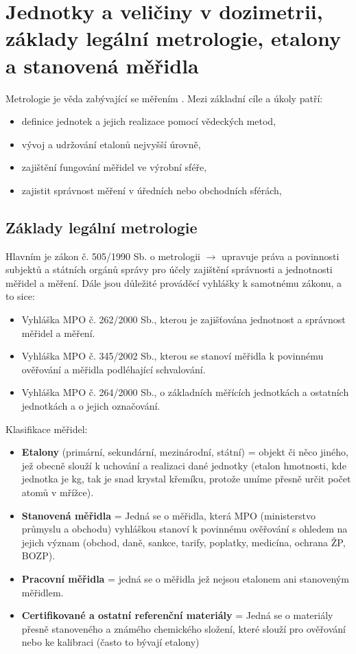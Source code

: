 \section[Jednotky a veličiny v dozimetrii]{Jednotky a veličiny v dozimetrii, základy legální metrologie, etalony a stanovená měřidla}

Metrologie je věda zabývající se měřením . Mezi základní cíle a úkoly patří:

\begin{itemize}
    \item definice jednotek a jejich realizace pomocí vědeckých metod,
    \item vývoj a udržování etalonů nejvyšší úrovně,
    \item zajištění fungování měřidel ve výrobní sféře,
    \item zajistit správnost měření v úředních nebo obchodních sférách,
\end{itemize}

\subsection{Základy legální metrologie}

Hlavním je zákon č. 505/1990 Sb. o metrologii $\rightarrow$ upravuje práva a povinnosti subjektů a státních orgánů správy pro účely zajištění správnosti a jednotnosti měřidel a měření.
Dále jsou důležité prováděcí vyhlášky k samotnému zákonu, a to sice:

\begin{itemize}
    \item Vyhláška MPO č. 262/2000 Sb., kterou je zajišťována jednotnost a správnost měřidel a měření.
    \item Vyhláška MPO č. 345/2002 Sb., kterou se stanoví měřidla k povinnému ověřování a měřidla podléhající schvalování.
    \item Vyhláška MPO č. 264/2000 Sb., o základních měřících jednotkách a ostatních jednotkách a o jejich označování.
\end{itemize}

Klasifikace měřidel:

\begin{itemize}
    \item \textbf{Etalony} (primární, sekundární, mezinárodní, státní) = objekt či něco jiného, jež obecně slouží k uchování a realizaci dané jednotky (etalon hmotnosti, kde jednotka je kg, tak je snad krystal křemíku, protože umíme přesně určit počet atomů v mřížce).
    \item \textbf{Stanovená měřidla} = Jedná se o měřidla, která MPO (ministerstvo průmyslu a obchodu) vyhláškou stanoví k povinnému ověřování s ohledem na jejich význam (obchod, daně, sankce, tarify, poplatky, medicína, ochrana ŽP, BOZP).
    \item \textbf{Pracovní měřidla} = jedná se o měřidla jež nejsou etalonem ani stanoveným měřidlem.
    \item \textbf{Certifikované a ostatní referenční materiály} = Jedná se o materiály přesně stanoveného a známého chemického složení, které slouží pro ověřování nebo ke kalibraci (často to bývají etalony)
\end{itemize}


